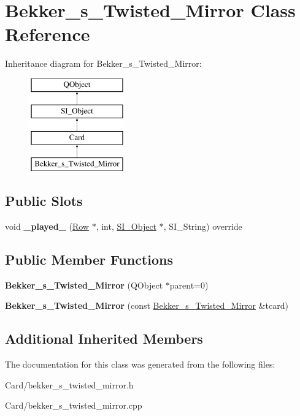 \hypertarget{class_bekker__s___twisted___mirror}{}\section{Bekker\+\_\+s\+\_\+\+Twisted\+\_\+\+Mirror Class Reference}
\label{class_bekker__s___twisted___mirror}
Inheritance diagram for Bekker\+\_\+s\+\_\+\+Twisted\+\_\+\+Mirror\+:\begin{figure}[H]
\begin{center}
\leavevmode
\includegraphics[height=4.000000cm]{class_bekker__s___twisted___mirror}
\end{center}
\end{figure}
\subsection*{Public Slots}
\begin{DoxyCompactItemize}
\item 
\mbox{\label{class_bekker__s___twisted___mirror_a2f903fcde55c3fa00c14709a4da0d75c}} 
void {\bfseries \+\_\+played\+\_\+} (\hyperlink{class_card_set}{Row} $\ast$, int, \hyperlink{class_s_i___object}{S\+I\+\_\+\+Object} $\ast$, S\+I\+\_\+\+String) override
\end{DoxyCompactItemize}
\subsection*{Public Member Functions}
\begin{DoxyCompactItemize}
\item 
\mbox{\label{class_bekker__s___twisted___mirror_af8e3e65363dea737a56d6778e57e0ab8}} 
{\bfseries Bekker\+\_\+s\+\_\+\+Twisted\+\_\+\+Mirror} (Q\+Object $\ast$parent=0)
\item 
\mbox{\label{class_bekker__s___twisted___mirror_ad7d7a9806509f633f1f9ca6b18da1f8c}} 
{\bfseries Bekker\+\_\+s\+\_\+\+Twisted\+\_\+\+Mirror} (const \hyperlink{class_bekker__s___twisted___mirror}{Bekker\+\_\+s\+\_\+\+Twisted\+\_\+\+Mirror} \&tcard)
\end{DoxyCompactItemize}
\subsection*{Additional Inherited Members}


The documentation for this class was generated from the following files\+:\begin{DoxyCompactItemize}
\item 
Card/bekker\+\_\+s\+\_\+twisted\+\_\+mirror.\+h\item 
Card/bekker\+\_\+s\+\_\+twisted\+\_\+mirror.\+cpp\end{DoxyCompactItemize}
